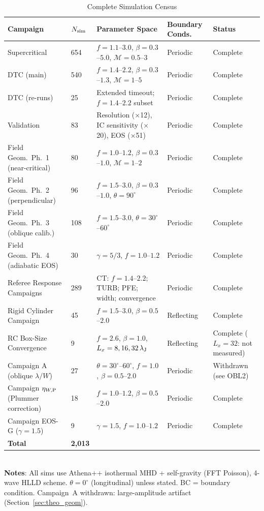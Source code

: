 \documentclass[twoside,twocolumn]{mnras}
\begin{document}
\begin{table}
\caption{Complete Simulation Census}
\label{tab:sim_census}
\small
\begin{tabular}{lllll}
\toprule
Campaign & $N_{\rm sim}$ & Parameter Space & Boundary Conds.\ & Status \\
\midrule
Supercritical & 654 & $f=1.1$--$3.0$, $\beta=0.3$--$5.0$, $\mathcal{M}=0.5$--$3$ & Periodic & Complete \\
DTC (main) & 540 & $f=1.4$--$2.2$, $\beta=0.3$--$1.3$, $\mathcal{M}=1$--$5$ & Periodic & Complete \\
DTC (re-runs) & 25 & Extended timeout; $f=1.4$--$2.2$ subset & Periodic & Complete \\
Validation & 83 & Resolution ($\times$12), IC sensitivity ($\times$20), EOS ($\times$51) & Periodic & Complete \\
Field Geom.\ Ph.\ 1 (near-critical) & 80 & $f=1.0$--$1.2$, $\beta=0.3$--$1.0$, $\mathcal{M}=1$--$2$ & Periodic & Complete \\
Field Geom.\ Ph.\ 2 (perpendicular) & 96 & $f=1.5$--$3.0$, $\beta=0.3$--$1.0$, $\theta=90^\circ$ & Periodic & Complete \\
Field Geom.\ Ph.\ 3 (oblique calib.) & 108 & $f=1.5$--$3.0$, $\theta=30^\circ$--$60^\circ$ & Periodic & Complete \\
Field Geom.\ Ph.\ 4 (adiabatic EOS) & 30 & $\gamma=5/3$, $f=1.0$--$1.2$ & Periodic & Complete \\
Referee Response Campaigns & 289 & CT: $f=1.4$--$2.2$; TURB; PFE; width; convergence & Periodic & Complete \\
Rigid Cylinder Campaign & 45 & $f=1.5$--$3.0$, $\beta=0.5$--$2.0$ & Reflecting & Complete \\
RC Box-Size Convergence & 9 & $f=2.6$, $\beta=1.0$, $L_x=8,16,32\,\lambda_{\rm J}$ & Reflecting & Complete ($L_x=32$: not measured) \\
Campaign A (oblique $\lambda/W$) & 27 & $\theta=30^\circ$--$60^\circ$, $f=1.0$, $\beta=0.5$--$2.0$ & Periodic & Withdrawn (see OBL2) \\
Campaign $\eta_{W,{\rm P}}$ (Plummer correction) & 18 & $f=1.0$--$1.2$, $\beta=0.5$--$2.0$ & Periodic & Complete \\
Campaign EOS-G ($\gamma=1.5$) & 9 & $\gamma=1.5$, $f=1.0$--$1.2$ & Periodic & Complete \\
\midrule
\textbf{Total} & \textbf{2,013} & & & \\
\bottomrule
\end{tabular}
\\[2pt]
\footnotesize \textbf{Notes}: All sims use Athena++ isothermal MHD + self-gravity (FFT Poisson), 4-wave HLLD scheme. $\theta=0^\circ$ (longitudinal) unless stated. BC = boundary condition. Campaign~A withdrawn: large-amplitude artifact (Section~\ref{sec:theo_geom}).
\end{table}
\end{document}

